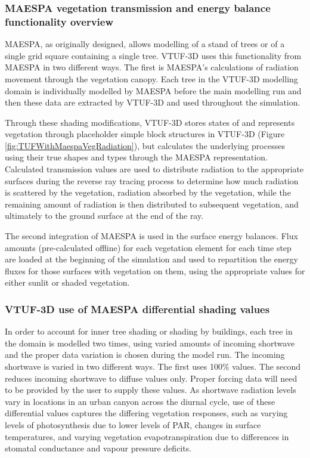\documentclass[final,3p,times,authoryear]{elsarticle}
\begin{document}
\subsubsection{MAESPA vegetation transmission and energy balance functionality overview}\label{sec:MAETrans}

MAESPA, as originally designed, allows modelling of a stand of trees or of a single grid square containing a single tree. VTUF-3D uses this functionality from MAESPA in two different ways. The first is MAESPA's calculations of radiation movement through the vegetation canopy. Each tree in the VTUF-3D modelling domain is individually modelled by MAESPA before the main modelling run and then these data are extracted by VTUF-3D and used throughout the simulation. 


Through these shading modifications, VTUF-3D stores states of and represents vegetation through placeholder simple block structures in VTUF-3D (Figure \ref{fig:TUFWithMaespaVegRadiation}), but calculates the underlying processes using their true shapes and types through the MAESPA representation. Calculated transmission values are used to distribute radiation to the appropriate surfaces during the reverse ray tracing process to determine how much radiation is scattered by the vegetation, radiation absorbed by the vegetation, while the remaining amount of radiation is then distributed to subsequent vegetation, and ultimately to the ground surface at the end of the ray. 

The second integration of MAESPA is used in the surface energy balances. Flux amounts (pre-calculated offline) for each vegetation element for each time step are loaded at the beginning of the simulation and used to repartition the energy fluxes for those surfaces with vegetation on them, using the appropriate values for either sunlit or shaded vegetation. 


\subsubsection{VTUF-3D use of MAESPA differential shading values}\label{sec:4diffshading}

In order to account for inner tree shading or shading by buildings, each tree in the domain is modelled two times, using varied amounts of incoming shortwave and the proper data variation is chosen during the model run. The incoming shortwave is varied in two different ways. The first uses 100\% values. The second reduces incoming shortwave to diffuse values only. Proper forcing data will need to be provided by the user to supply these values. As shortwave radiation levels vary in locations in an urban canyon across the diurnal cycle, use of these differential values captures the differing vegetation responses, such as varying levels of photosynthesis due to lower levels of PAR, changes in surface temperatures, and varying vegetation evapotranspiration due to differences in stomatal conductance and vapour pressure deficits.
\end{document}
